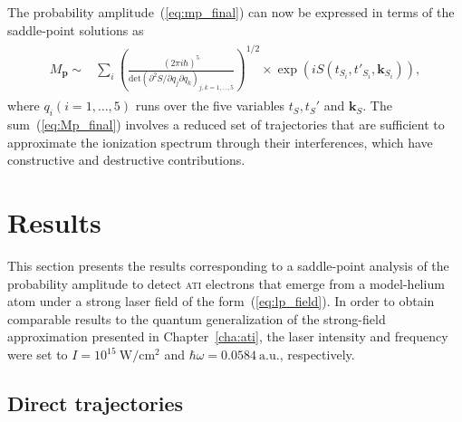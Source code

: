 The probability amplitude~(\ref{eq:mp_final}) can now be expressed in
terms of the saddle-point solutions as~\cite{KopoldOptComm2000}
%
\begin{eqnarray}
\label{eq:Mp_final}
\begin{split}
M_{\mathbf{p}} \sim & \sum\limits_{i} \left( \frac{(2\pi i \hbar)^{5}}
{\mathrm{det} (\partial^{2}S / \partial q_{j} \partial q_{k})_{j,k = 1, \dots, 5}}
\right)^{1/2} \times \exp(i S(t_{S_{i}}, t'_{S_{i}}, \mathbf{k}_{S_{i}})),
\end{split}
\end{eqnarray}
%
where $q_{i}(i = 1,\dots,5)$ runs over the five variables $t_{S},
t_{S}'$ and $\mathbf{k}_{S}$. The sum~(\ref{eq:Mp_final}) involves a
reduced set of trajectories that are sufficient to approximate the
ionization spectrum through their interferences, which have
constructive and destructive contributions.


\section{\label{sec:spa_results} Results}

This section presents the results corresponding to a saddle-point
analysis of the probability amplitude to detect \textsc{ati} electrons
that emerge from a model-helium atom under a strong laser field of the
form~(\ref{eq:lp_field}). In order to obtain comparable results to the
quantum generalization of the strong-field approximation presented in
Chapter~\ref{cha:ati}, the laser intensity and frequency were set to
$I = 10^{15}\ \mathrm{W/cm^{2}}$ and $\hbar\omega =
0.0584\ \mathrm{a.u.}$, respectively.


\subsection{\label{sec:spa_direct} Direct trajectories}

